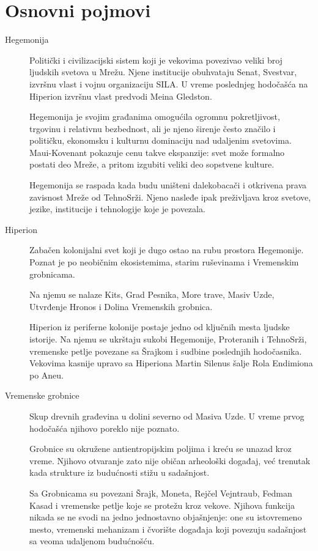 \section*{Osnovni pojmovi}

\begin{description}

  \item[Hegemonija]
  Politički i civilizacijski sistem koji je vekovima povezivao veliki broj ljudskih svetova u Mrežu. Njene institucije obuhvataju Senat, Svestvar, izvršnu vlast i vojnu organizaciju SILA. U vreme poslednjeg hodočašća na Hiperion izvršnu vlast predvodi Meina Gledston.

  Hegemonija je svojim građanima omogućila ogromnu pokretljivost, trgovinu i relativnu bezbednost, ali je njeno širenje često značilo i političku, ekonomsku i kulturnu dominaciju nad udaljenim svetovima. Maui-Kovenant pokazuje cenu takve ekspanzije: svet može formalno postati deo Mreže, a pritom izgubiti veliki deo sopstvene kulture.

  Hegemonija se raspada kada budu uništeni dalekobacači i otkrivena prava zavisnost Mreže od TehnoSrži. Njeno nasleđe ipak preživljava kroz svetove, jezike, institucije i tehnologije koje je povezala.


  \item[Hiperion]
  Zabačen kolonijalni svet koji je dugo ostao na rubu prostora Hegemonije. Poznat je po neobičnim ekosistemima, starim ruševinama i Vremenskim grobnicama.

  Na njemu se nalaze Kits, Grad Pesnika, More trave, Masiv Uzde, Utvrđenje Hronos i Dolina Vremenskih grobnica.

  Hiperion iz periferne kolonije postaje jedno od ključnih mesta ljudske istorije. Na njemu se ukrštaju sukobi Hegemonije, Proteranih i TehnoSrži, vremenske petlje povezane sa Šrajkom i sudbine poslednjih hodočasnika. Vekovima kasnije upravo sa Hiperiona Martin Silenus šalje Rola Endimiona po Aneu.


  \item[Vremenske grobnice]
  Skup drevnih građevina u dolini severno od Masiva Uzde. U vreme prvog hodočašća njihovo poreklo nije poznato.

  Grobnice su okružene antientropijskim poljima i kreću se unazad kroz vreme. Njihovo otvaranje zato nije običan arheološki događaj, već trenutak kada strukture iz budućnosti stižu u sadašnjost.

  Sa Grobnicama su povezani Šrajk, Moneta, Rejčel Vejntraub, Fedman Kasad i vremenske petlje koje se protežu kroz vekove. Njihova funkcija nikada se ne svodi na jedno jednostavno objašnjenje: one su istovremeno mesto, vremenski mehanizam i čvorište događaja koji povezuju sadašnjost sa veoma udaljenom budućnošću.



\end{description}
